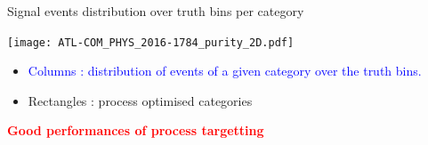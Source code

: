 \begin{frame}{Signal events distribution over truth bins per category}
  \begin{minipage}{0.6\linewidth}
      \texttt{[image: ATL-COM\_PHYS\_2016-1784\_purity\_2D.pdf]}
  \end{minipage}
  \hfill
  \begin{minipage}{0.39\linewidth}
    \begin{itemize}
    \item \textcolor{blue}{Columns : distribution of events of a given category over the truth bins.}
    \item Rectangles : process optimised categories
    \end{itemize}
  \end{minipage}
  
  \centering
  \textcolor{red}{\bf Good performances of process targetting}
\end{frame}
